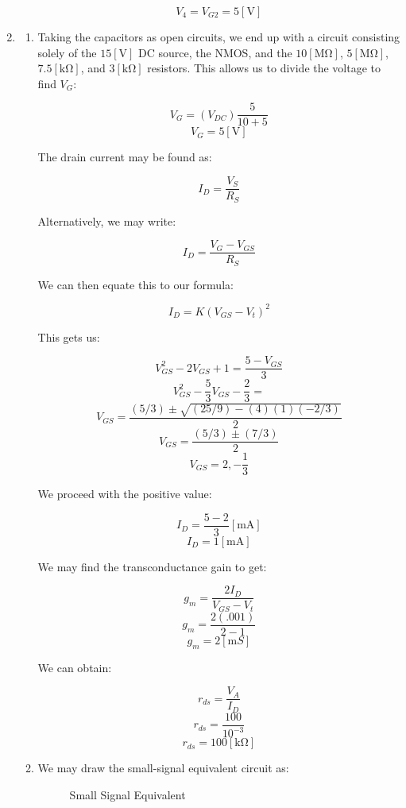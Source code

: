 \begin{enumerate}
\begin{enumerate}
        $$\boxed{V_4=V_{G2}=5[\si{\volt}]}$$

    \end{enumerate}

  \item

    \begin{enumerate}

      \item Taking the capacitors as open circuits, we end up with a circuit consisting solely of the $15[\si{\volt}]$ DC source, the NMOS, and the $10[\si{\mega\ohm}]$, $5[\si{\mega\ohm}]$, $7.5[\si{\kilo\ohm}]$, and $3[\si{\kilo\ohm}]$ resistors. This allows us to divide the voltage to find $V_G$:

        $$V_G=(V_{DC})\frac{5}{10+5}$$
        $$\boxed{V_G=5[\si{\volt}]}$$

        The drain current may be found as:

        $$I_D=\frac{V_S}{R_S}$$

        Alternatively, we may write:

        $$I_D=\frac{V_G-V_{GS}}{R_S}$$

        We can then equate this to our formula:

        $$I_D=K(V_{GS}-V_t)^2$$

        This gets us:

        $$V_{GS}^2-2V_{GS}+1=\frac{5-V_{GS}}{3}$$
        $$V_{GS}^2-\frac{5}{3}V_{GS}-\frac{2}{3}=$$
        $$V_{GS}=\frac{(5/3)\pm\sqrt{(25/9)-(4)(1)(-2/3)}}{2}$$
        $$V_{GS}=\frac{(5/3)\pm(7/3)}{2}$$
        $$V_{GS}=2,-\frac{1}{3}$$

        We proceed with the positive value:

        $$I_D=\frac{5-2}{3}[\si{\milli\ampere}]$$
        $$\boxed{I_D=1[\si{\milli\ampere}]}$$

        We may find the transconductance gain to get:

        $$g_m=\frac{2I_D}{V_{GS}-V_t}$$
        $$g_m=\frac{2(.001)}{2-1}$$
        $$\boxed{g_m=2[\si{\milli S}]}$$

        We can obtain:

        $$r_{ds}=\frac{V_A}{I_D}$$
        $$r_{ds}=\frac{100}{10^{-3}}$$
        $$\boxed{r_{ds}=100[\si{\kilo\ohm}]}$$

      \item We may draw the small-signal equivalent circuit as:

        \begin{figure}[H]
          \centering
          
          \caption{Small Signal Equivalent}
          \label{fig:2}
        \end{figure}


\end{enumerate}
\end{enumerate}
